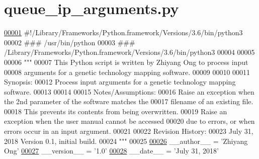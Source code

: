 \hypertarget{queue__ip__arguments_8py_source}{}\section{queue\+\_\+ip\+\_\+arguments.\+py}
\label{queue__ip__arguments_8py_source}

\begin{DoxyCode}
\hypertarget{queue__ip__arguments_8py_source_l00001}{}\hyperlink{namespaceutilities_1_1queue__ip__arguments}{00001} \textcolor{comment}{#!/Library/Frameworks/Python.framework/Versions/3.6/bin/python3}
00002 \textcolor{comment}{### /usr/bin/python}
00003 \textcolor{comment}{### /Library/Frameworks/Python.framework/Versions/3.6/bin/python3}
00004 
00005 
00006 \textcolor{stringliteral}{"""}
00007 \textcolor{stringliteral}{    This Python script is written by Zhiyang Ong to process input}
00008 \textcolor{stringliteral}{        arguments for a genetic technology mapping software.}
00009 \textcolor{stringliteral}{}
00010 \textcolor{stringliteral}{}
00011 \textcolor{stringliteral}{    Synopsis:}
00012 \textcolor{stringliteral}{    Process input arguments for a genetic technology mapping software.}
00013 \textcolor{stringliteral}{}
00014 \textcolor{stringliteral}{}
00015 \textcolor{stringliteral}{    Notes/Assumptions:}
00016 \textcolor{stringliteral}{    Raise an exception when the 2nd parameter of the software matches the}
00017 \textcolor{stringliteral}{        filename of an existing file.}
00018 \textcolor{stringliteral}{        This prevents its contents from being overwritten.}
00019 \textcolor{stringliteral}{    Raise an exception when the user manual cannot be accessed}
00020 \textcolor{stringliteral}{        due to errors, or when errors occur in an input argument.}
00021 \textcolor{stringliteral}{}
00022 \textcolor{stringliteral}{    Revision History:}
00023 \textcolor{stringliteral}{    July 31, 2018           Version 0.1, initial build.}
00024 \textcolor{stringliteral}{"""}
00025 
\hypertarget{queue__ip__arguments_8py_source_l00026}{}\hyperlink{namespaceutilities_1_1queue__ip__arguments_adc999d785e9803ef585833d4c1ae53e4}{00026} \_\_author\_\_ = \textcolor{stringliteral}{'Zhiyang Ong'}
\hypertarget{queue__ip__arguments_8py_source_l00027}{}\hyperlink{namespaceutilities_1_1queue__ip__arguments_aac0867ebe34eaed5fb081f33e4ac9740}{00027} \_\_version\_\_ = \textcolor{stringliteral}{'1.0'}
\hypertarget{queue__ip__arguments_8py_source_l00028}{}\hyperlink{namespaceutilities_1_1queue__ip__arguments_a43f24226d75dbc13271de84f469f6944}{00028} \_\_date\_\_ = \textcolor{stringliteral}{'July 31, 2018'}

\end{DoxyCode}

